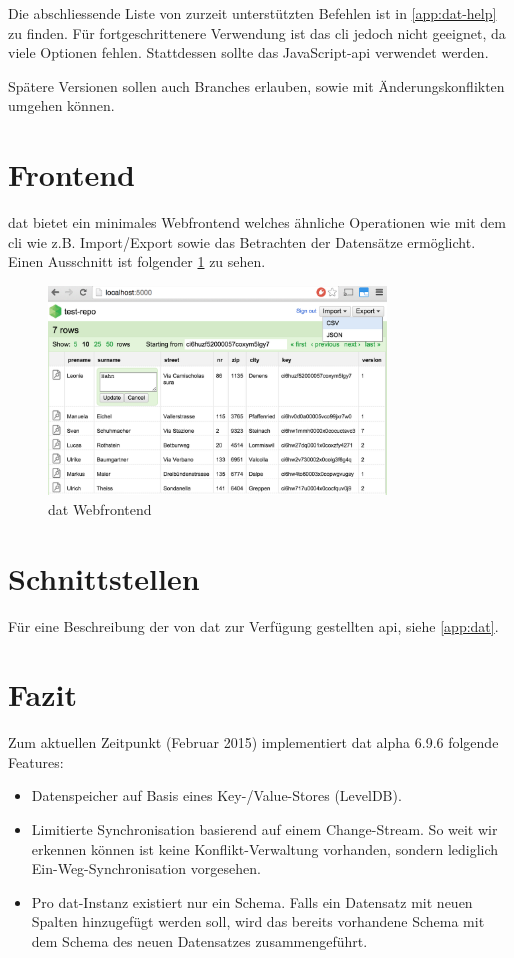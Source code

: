 Die abschliessende Liste von zurzeit unterstützten Befehlen ist in 
\vref{app:dat-help} zu finden. Für fortgeschrittenere Verwendung ist das \gls{cli} jedoch nicht geeignet, da viele Optionen fehlen. Stattdessen sollte das JavaScript-\acs{api} verwendet werden.

Spätere Versionen sollen auch Branches erlauben, sowie mit Änderungskonflikten umgehen können.

\section{Frontend}

\Gls{dat} bietet ein minimales Webfrontend welches ähnliche Operationen wie mit dem \gls{cli} wie z.B. Import/Export sowie das Betrachten der Datensätze ermöglicht. Einen Ausschnitt ist folgender \cref{fig:dat:webfrontend} zu sehen.

\begin{figure}[H]
  \centering
  \includegraphics[width=0.8\textwidth]{fig/webfrontend}
  \caption{dat Webfrontend}
  \label{fig:dat:webfrontend}
\end{figure}

\section{Schnittstellen}
Für eine Beschreibung der von \gls{dat} zur Verfügung gestellten \gls{api}, siehe \vref{app:dat}.


\section{Fazit}
Zum aktuellen Zeitpunkt (Februar 2015) implementiert dat alpha 6.9.6 folgende Features:
\begin{itemize}
\item Datenspeicher auf Basis eines Key-/Value-Stores (LevelDB).
\item Limitierte Synchronisation basierend auf einem Change-Stream. So weit wir erkennen können ist keine Konflikt-Verwaltung vorhanden, sondern lediglich Ein-Weg-Synchronisation vorgesehen.
\item Pro dat-Instanz existiert nur ein Schema. Falls ein Datensatz mit neuen Spalten hinzugefügt werden soll, wird das bereits vorhandene Schema mit dem Schema des neuen Datensatzes zusammengeführt.
\end{itemize}


